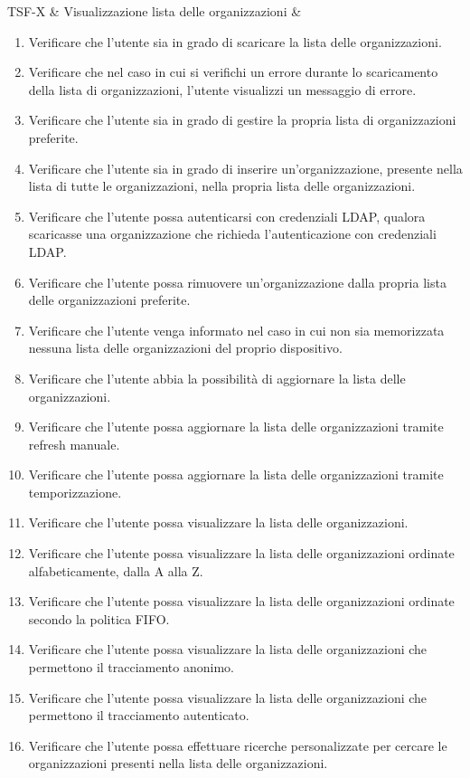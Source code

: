 TSF-X & Visualizzazione lista delle organizzazioni & \begin{enumerate}
\item Verificare che l'utente sia in grado di scaricare la lista delle organizzazioni.
\item Verificare che nel caso in cui si verifichi un errore durante lo scaricamento della lista di organizzazioni, l'utente visualizzi un messaggio di errore.
\item Verificare che l'utente sia in grado di gestire la propria lista di organizzazioni preferite.
\item Verificare che l'utente sia in grado di inserire un'organizzazione, presente nella lista di tutte le organizzazioni,  nella propria lista delle organizzazioni.
\item Verificare che l'utente possa autenticarsi con credenziali LDAP, qualora scaricasse una organizzazione che richieda l'autenticazione con credenziali LDAP.
\item Verificare che l'utente possa rimuovere un'organizzazione dalla propria lista delle organizzazioni preferite.
\item Verificare che l'utente venga informato nel caso in cui non sia memorizzata nessuna lista delle organizzazioni del proprio dispositivo.
\item Verificare che l'utente abbia la possibilità di aggiornare la lista delle organizzazioni.
\item Verificare che l'utente possa aggiornare la lista delle organizzazioni tramite refresh manuale.
\item Verificare che l'utente possa aggiornare la lista delle organizzazioni tramite temporizzazione.
\item Verificare che l'utente possa visualizzare la lista delle organizzazioni.
\item Verificare che l'utente possa visualizzare la lista delle organizzazioni ordinate alfabeticamente, dalla A alla Z.
\item Verificare che l'utente possa visualizzare la lista delle organizzazioni ordinate secondo la politica FIFO.
\item Verificare che l'utente possa visualizzare la lista delle organizzazioni che permettono il tracciamento anonimo.
\item Verificare che l'utente possa visualizzare la lista delle organizzazioni che permettono il tracciamento autenticato.
\item Verificare che l'utente possa effettuare ricerche personalizzate per cercare le organizzazioni presenti nella lista delle organizzazioni.

\end{enumerate}
